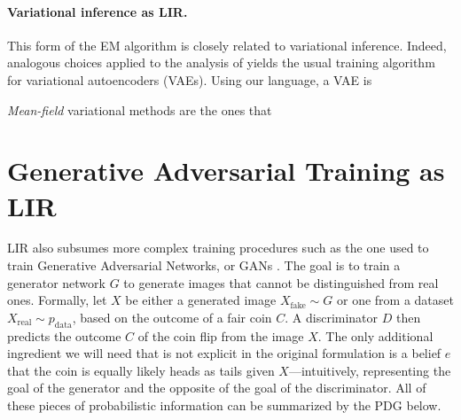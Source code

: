 \documentclass{article} %
\theoremstyle{plain}
\theoremstyle{definition}
\theoremstyle{remark}
\let\cite\citep
\begin{document}
\paragraph{Variational inference as LIR.}
This form of the EM algorithm is closely related to variational inference.
Indeed, analogous choices applied to the analysis of \citet{one-true-loss}
yields the usual training algorithm for variational autoencoders (VAEs). Using our language, a VAE is 


\emph{Mean-field} variational methods are the ones that  


\section{Generative Adversarial Training as LIR}
\def\pdata{p_{\mathrm{data}}}
\def\real{{\mathrm{real}}}
\def\fake{{\mathrm{fake}}}
LIR also subsumes more complex training procedures such as the one used to train
Generative Adversarial Networks, or GANs \cite{goodfellow2020generative}.
The goal is to train a generator network $G$ to generate images that cannot be distinguished
   from real ones.
%
Formally, let $X$ be either a generated image $X_{\fake}\sim G$ or one from a dataset
$X_\real \sim \pdata$, based on the outcome of a fair coin $C$.
A discriminator $D$ then predicts the outcome $C$ of the coin flip from the image $X$.
%
The only additional ingredient we will need that is not explicit in the original formulation is a belief $e$ that the coin is equally likely heads as tails given $X$---intuitively, representing the goal of the generator and the opposite of the goal of the discriminator.
All of these pieces of probabilistic information can be summarized by the PDG below.
%
\end{document}
